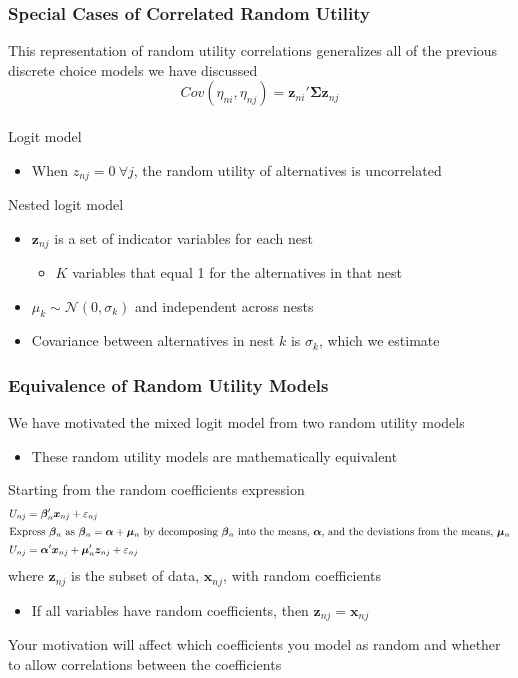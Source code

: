 \documentclass{beamer}
\begin{document}
\begin{frame}\frametitle{Special Cases of Correlated Random Utility}
    This representation of random utility correlations generalizes all of the previous discrete choice models we have discussed
    $$Cov(\eta_{ni}, \eta_{nj}) = \bm{z}_{ni}' \bm{\Sigma} \bm{z}_{nj}$$ \\
    \vspace{2ex}
    Logit model
    \begin{itemize}
    	\item When $z_{nj} = 0 ~\forall j$, the random utility of alternatives is uncorrelated
    \end{itemize}
    \vspace{2ex}
    Nested logit model
    \begin{itemize}
    	\item $\bm{z}_{nj}$ is a set of indicator variables for each nest
    	\begin{itemize}
    		\item $K$ variables that equal 1 for the alternatives in that nest
    	\end{itemize}
    	\item $\mu_k \sim \mathcal{N}(0, \sigma_k)$ and independent across nests
    	\item Covariance between alternatives in nest $k$ is $\sigma_k$, which we estimate
    \end{itemize}
\end{frame}

\begin{frame}\frametitle{Equivalence of Random Utility Models}
    We have motivated the mixed logit model from two random utility models
    \begin{itemize}
    	\item These random utility models are mathematically equivalent
    \end{itemize}
    \vspace{2ex}
    Starting from the random coefficients expression
    \begin{align*}
        U_{nj} & = \bm{\beta}_n' \bm{x}_{nj} + \varepsilon_{nj} \\
        \intertext{Express $\bm{\beta}_n$ as $\bm{\beta}_n = \bm{\alpha} + \bm{\mu}_n$ by decomposing $\bm{\beta}_n$ into the means, $\bm{\alpha}$, and the deviations from the means, $\bm{\mu}_n$}
        U_{nj} & = \bm{\alpha}' \bm{x}_{nj} + \bm{\mu}_n' \bm{z}_{nj} + \varepsilon_{nj}
    \end{align*}
    where $\bm{z}_{nj}$ is the subset of data, $\bm{x}_{nj}$, with random coefficients
    \begin{itemize}
    	\item If all variables have random coefficients, then $\bm{z}_{nj} = \bm{x}_{nj}$
    \end{itemize}
    \vspace{2ex}
    Your motivation will affect which coefficients you model as random and whether to allow correlations between the coefficients
\end{frame}
\end{document}
